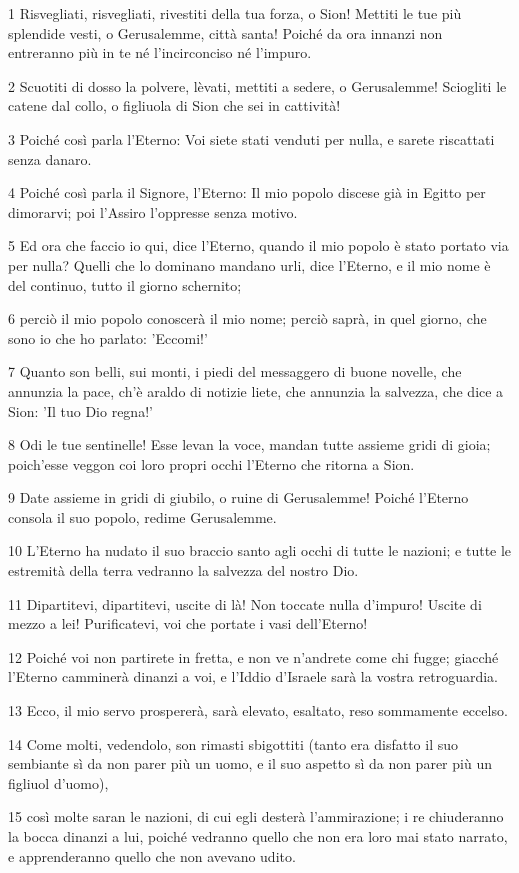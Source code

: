 \par 1 Risvegliati, risvegliati, rivestiti della tua forza, o Sion! Mettiti le tue più splendide vesti, o Gerusalemme, città santa! Poiché da ora innanzi non entreranno più in te né l'incirconciso né l'impuro.
\par 2 Scuotiti di dosso la polvere, lèvati, mettiti a sedere, o Gerusalemme! Sciogliti le catene dal collo, o figliuola di Sion che sei in cattività!
\par 3 Poiché così parla l'Eterno: Voi siete stati venduti per nulla, e sarete riscattati senza danaro.
\par 4 Poiché così parla il Signore, l'Eterno: Il mio popolo discese già in Egitto per dimorarvi; poi l'Assiro l'oppresse senza motivo.
\par 5 Ed ora che faccio io qui, dice l'Eterno, quando il mio popolo è stato portato via per nulla? Quelli che lo dominano mandano urli, dice l'Eterno, e il mio nome è del continuo, tutto il giorno schernito;
\par 6 perciò il mio popolo conoscerà il mio nome; perciò saprà, in quel giorno, che sono io che ho parlato: 'Eccomi!'
\par 7 Quanto son belli, sui monti, i piedi del messaggero di buone novelle, che annunzia la pace, ch'è araldo di notizie liete, che annunzia la salvezza, che dice a Sion: 'Il tuo Dio regna!'
\par 8 Odi le tue sentinelle! Esse levan la voce, mandan tutte assieme gridi di gioia; poich'esse veggon coi loro propri occhi l'Eterno che ritorna a Sion.
\par 9 Date assieme in gridi di giubilo, o ruine di Gerusalemme! Poiché l'Eterno consola il suo popolo, redime Gerusalemme.
\par 10 L'Eterno ha nudato il suo braccio santo agli occhi di tutte le nazioni; e tutte le estremità della terra vedranno la salvezza del nostro Dio.
\par 11 Dipartitevi, dipartitevi, uscite di là! Non toccate nulla d'impuro! Uscite di mezzo a lei! Purificatevi, voi che portate i vasi dell'Eterno!
\par 12 Poiché voi non partirete in fretta, e non ve n'andrete come chi fugge; giacché l'Eterno camminerà dinanzi a voi, e l'Iddio d'Israele sarà la vostra retroguardia.
\par 13 Ecco, il mio servo prospererà, sarà elevato, esaltato, reso sommamente eccelso.
\par 14 Come molti, vedendolo, son rimasti sbigottiti (tanto era disfatto il suo sembiante sì da non parer più un uomo, e il suo aspetto sì da non parer più un figliuol d'uomo),
\par 15 così molte saran le nazioni, di cui egli desterà l'ammirazione; i re chiuderanno la bocca dinanzi a lui, poiché vedranno quello che non era loro mai stato narrato, e apprenderanno quello che non avevano udito.

